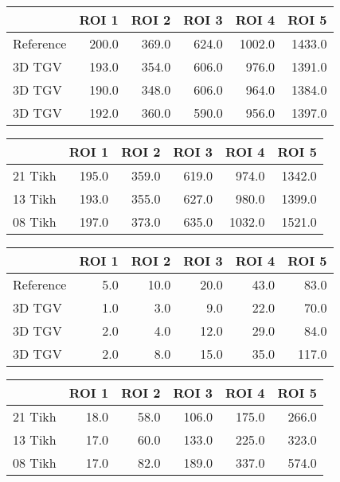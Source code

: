 \begin{tabular}{lrrrrr}
\toprule
{} &  ROI 1 &  ROI 2 &  ROI 3 &   ROI 4 &   ROI 5 \\
\midrule
Reference &  200.0 &  369.0 &  624.0 &  1002.0 &  1433.0 \\
3D TGV    &  193.0 &  354.0 &  606.0 &   976.0 &  1391.0 \\
3D TGV    &  190.0 &  348.0 &  606.0 &   964.0 &  1384.0 \\
3D TGV    &  192.0 &  360.0 &  590.0 &   956.0 &  1397.0 \\
\bottomrule
\end{tabular}
\begin{tabular}{lrrrrr}
\toprule
{} &  ROI 1 &  ROI 2 &  ROI 3 &   ROI 4 &   ROI 5 \\
\midrule
21 Tikh &  195.0 &  359.0 &  619.0 &   974.0 &  1342.0 \\
13 Tikh &  193.0 &  355.0 &  627.0 &   980.0 &  1399.0 \\
08 Tikh &  197.0 &  373.0 &  635.0 &  1032.0 &  1521.0 \\
\bottomrule
\end{tabular}
\begin{tabular}{lrrrrr}
\toprule
{} &  ROI 1 &  ROI 2 &  ROI 3 &  ROI 4 &  ROI 5 \\
\midrule
Reference &    5.0 &   10.0 &   20.0 &   43.0 &   83.0 \\
3D TGV    &    1.0 &    3.0 &    9.0 &   22.0 &   70.0 \\
3D TGV    &    2.0 &    4.0 &   12.0 &   29.0 &   84.0 \\
3D TGV    &    2.0 &    8.0 &   15.0 &   35.0 &  117.0 \\
\bottomrule
\end{tabular}
\begin{tabular}{lrrrrr}
\toprule
{} &  ROI 1 &  ROI 2 &  ROI 3 &  ROI 4 &  ROI 5 \\
\midrule
21 Tikh &   18.0 &   58.0 &  106.0 &  175.0 &  266.0 \\
13 Tikh &   17.0 &   60.0 &  133.0 &  225.0 &  323.0 \\
08 Tikh &   17.0 &   82.0 &  189.0 &  337.0 &  574.0 \\
\bottomrule
\end{tabular}
